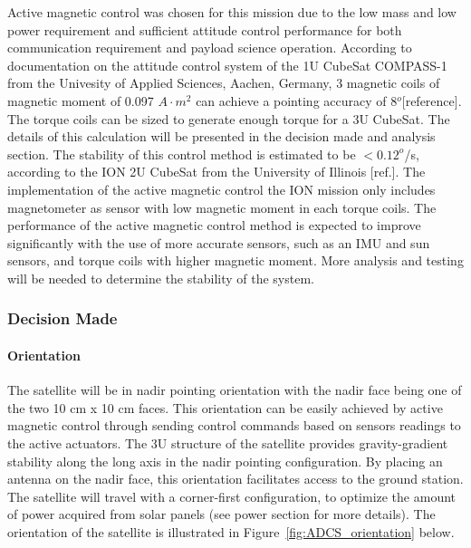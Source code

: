 \documentclass[12pt]{article}
\begin{document}
Active magnetic control was chosen for this mission due to the low mass and low power requirement and sufficient attitude control performance for both communication requirement and payload science operation. According to documentation on the attitude control system of the 1U CubeSat COMPASS-1 from the Univesity of Applied Sciences, Aachen, Germany, 3 magnetic coils of magnetic moment of  0.097 $A \cdot m^2$ can achieve a pointing accuracy of 8$^o$[reference]. The torque coils can be sized to generate enough torque for a 3U CubeSat. The details of this calculation will be presented in the decision made and analysis section. The stability of this control method is estimated to be $< 0.12^o$/s, according to the ION 2U CubeSat from the University of Illinois [ref.]. The implementation of the active magnetic control the ION mission only includes magnetometer as sensor with low magnetic moment in each torque coils. The performance of the active magnetic control method is expected to improve significantly with the use of more accurate sensors, such as an IMU and sun sensors, and torque coils with higher magnetic moment. More analysis and testing will be needed to determine the stability of the system. 
			\subsubsection{Decision Made}
				\paragraph{Orientation}
				The satellite will be in nadir pointing orientation with the nadir face being one of the two 10 cm x 10 cm faces. This orientation can be easily achieved by active magnetic control through sending control commands based on sensors readings to the active actuators. The 3U structure of the satellite provides gravity-gradient stability along the long axis in the nadir pointing configuration. By placing an antenna on the nadir face, this orientation facilitates access to the ground station. The satellite will travel with a corner-first configuration, to optimize the amount of power acquired from solar panels (see power section for more details). The orientation of the satellite is illustrated in Figure~\ref{fig:ADCS_orientation} below. 
			
\end{document}
